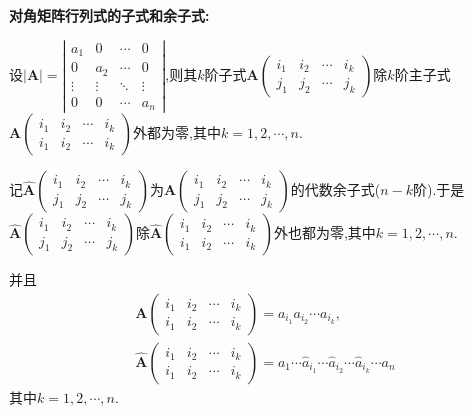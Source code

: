 \documentclass[../../main.tex]{subfiles}%
\begin{document}
\begin{conclusion}\label{对角矩阵行列式的子式和余子式}
\hypertarget{对角矩阵行列式的子式和余子式}{\textbf{对角矩阵行列式的子式和余子式:}}

设\(|\boldsymbol{A}|=\left|\begin{matrix}
a_1 & 0 & \cdots & 0\\
0 & a_2 & \cdots & 0\\
\vdots & \vdots & \ddots & \vdots\\
0 & 0 & \cdots & a_n
\end{matrix}\right|\),则其\(k\)阶子式\(\boldsymbol{A}\left(\begin{matrix}
i_1 & i_2 & \cdots & i_k\\
j_1 & j_2 & \cdots & j_k
\end{matrix}\right)\)除\(k\)阶主子式\(\boldsymbol{A}\left(\begin{matrix}
i_1 & i_2 & \cdots & i_k\\
i_1 & i_2 & \cdots & i_k
\end{matrix}\right)\)外都为零,其中\(k = 1,2,\cdots,n\).

记\(\widehat{\boldsymbol{A}}\left(\begin{matrix}
i_1 & i_2 & \cdots & i_k\\
j_1 & j_2 & \cdots & j_k
\end{matrix}\right)\)为\(\boldsymbol{A}\left(\begin{matrix}
i_1 & i_2 & \cdots & i_k\\
j_1 & j_2 & \cdots & j_k
\end{matrix}\right)\)的代数余子式(\(n - k\)阶).于是\(\widehat{\boldsymbol{A}}\left(\begin{matrix}
i_1 & i_2 & \cdots & i_k\\
j_1 & j_2 & \cdots & j_k
\end{matrix}\right)\)除\(\widehat{\boldsymbol{A}}\left(\begin{matrix}
i_1 & i_2 & \cdots & i_k\\
i_1 & i_2 & \cdots & i_k
\end{matrix}\right)\)外也都为零,其中\(k = 1,2,\cdots,n\).

并且
\begin{align*}
&\boldsymbol{A}\left(\begin{matrix}
i_1 & i_2 & \cdots & i_k\\
i_1 & i_2 & \cdots & i_k
\end{matrix}\right) = a_{i_1}a_{i_2}\cdots a_{i_k},
\\
&\widehat{\boldsymbol{A}}\left(\begin{matrix}
i_1 & i_2 & \cdots & i_k\\
i_1 & i_2 & \cdots & i_k
\end{matrix}\right) = a_1\cdots \hat{a}_{i_1}\cdots \hat{a}_{i_2}\cdots \hat{a}_{i_k}\cdots a_n\,
\end{align*}
其中\(k = 1,2,\cdots,n\).
\end{conclusion}
\end{document}
